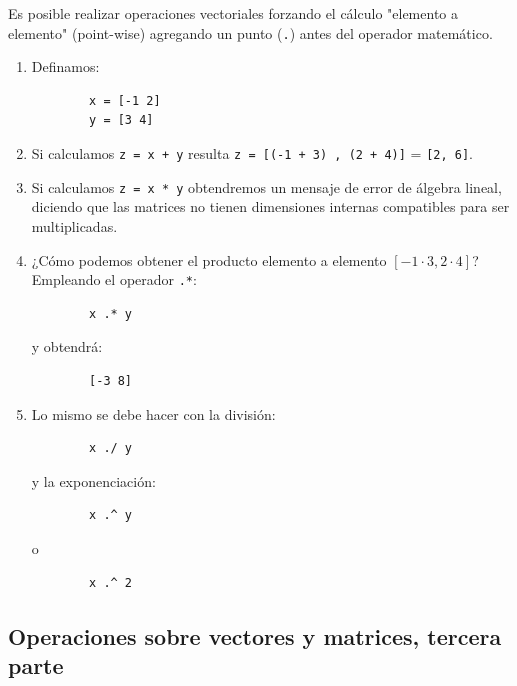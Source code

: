 Es posible realizar operaciones vectoriales forzando el cálculo "elemento a elemento" (point-wise) agregando un punto (\texttt{.}) antes del operador matemático.
\begin{enumerate}
	\item Definamos:
	\begin{verbatim}
		x = [-1 2]
		y = [3 4]
	\end{verbatim}
	
	\item Si calculamos \texttt{z = x + y} resulta \texttt{z = [(-1 + 3) , (2 + 4)]} = \texttt{[2, 6]}.
	\item Si calculamos \texttt{z = x * y} obtendremos un mensaje de error de álgebra lineal, diciendo que las matrices no tienen dimensiones internas compatibles para ser multiplicadas.
	\item ¿Cómo podemos obtener el producto elemento a elemento $[-1 \cdot 3, 2 \cdot 4]$? Empleando el operador \texttt{.*}:
	\begin{verbatim}
		x .* y
	\end{verbatim}
	y obtendrá:
	\begin{verbatim}
		[-3 8]
	\end{verbatim}
	
	\item Lo mismo se debe hacer con la división:
	\begin{verbatim}
		x ./ y
	\end{verbatim}
	y la exponenciación:
	\begin{verbatim}
		x .^ y
	\end{verbatim}
	o
	\begin{verbatim}
		x .^ 2
	\end{verbatim}
\end{enumerate}

\subsection{Operaciones sobre vectores y matrices, tercera parte}

